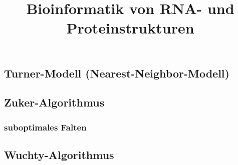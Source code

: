 \documentclass[12pt,a4paper]{article}
\title{\Huge\textbf{Bioinformatik von RNA- und Proteinstrukturen}}
\author{}
\date{}
\begin{document}
\begin{titlepage}

\maketitle
\thispagestyle{empty}
\end{titlepage}
\newpage

\begin{titlepage}
\tableofcontents
\thispagestyle{empty}
\end{titlepage}
\newpage



\newpage



\newpage



\newpage



\newpage



\newpage



\newpage



\newpage



\newpage



\subsection{Turner-Modell (Nearest-Neighbor-Modell)}

\subsection{Zuker-Algorithmus}

\subsubsection{suboptimales Falten}

\subsection{Wuchty-Algorithmus}
\end{document}
